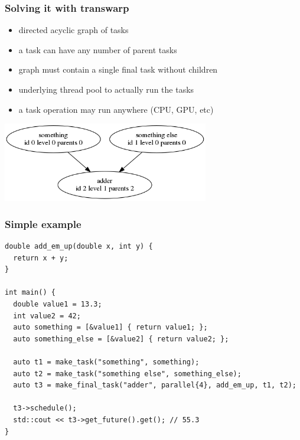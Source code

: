 \documentclass[11pt]{beamer}
\begin{document}
\begin{frame}[fragile]
\frametitle{Solving it with transwarp}

\begin{itemize}
\itemsep .5em
\item directed acyclic graph of tasks
\item a task can have any number of parent tasks
\item graph must contain a single final task without children
\item underlying thread pool to actually run the tasks
\item a task operation may run anywhere (CPU, GPU, etc)
\end{itemize}

\bigskip
\bigskip

\includegraphics[width=9cm]{img/basic_with_three_tasks.png}

\end{frame}


\begin{frame}[fragile]
\frametitle{Simple example}

\begin{lstlisting}
double add_em_up(double x, int y) {
  return x + y;
}

int main() {
  double value1 = 13.3;
  int value2 = 42;
  auto something = [&value1] { return value1; };
  auto something_else = [&value2] { return value2; };

  auto t1 = make_task("something", something);
  auto t2 = make_task("something else", something_else);
  auto t3 = make_final_task("adder", parallel{4}, add_em_up, t1, t2);

  t3->schedule();
  std::cout << t3->get_future().get(); // 55.3
}
\end{lstlisting}

\end{frame}
\end{document}
